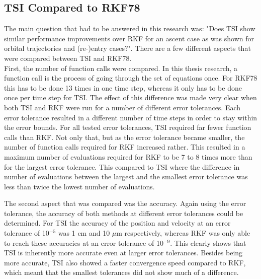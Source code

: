 



\subsection{\ac{TSI} Compared to \ac{RKF78}}
\label{subsec:TSIcomparedToRKF78}
The main question that had to be answered in this research was: "Does \ac{TSI} show similar performance improvements over \ac{RKF} for an ascent case as was shown for orbital trajectories and (re-)entry cases?". There are a few different aspects that were compared between \ac{TSI} and \ac{RKF78}.\\
First, the number of function calls were compared. In this thesis research, a function call is the process of going through the set of equations once. For \ac{RKF78} this has to be done 13 times in one time step, whereas it only has to be done once per time step for \ac{TSI}. The effect of this difference was made very clear when both \ac{TSI} and \ac{RKF} were run for a number of different error tolerances. Each error tolerance resulted in a different number of time steps in order to stay within the error bounds. For all tested error tolerances, \ac{TSI} required far fewer function calls than \ac{RKF}. Not only that, but as the error tolerance became smaller, the number of function calls required for \ac{RKF} increased rather. This resulted in a maximum number of evaluations required for \ac{RKF} to be 7 to 8 times more than for the largest error tolerance. This compared to \ac{TSI} where the difference in number of evaluations between the largest and the smallest error tolerance was less than twice the lowest number of evaluations.

The second aspect that was compared was the accuracy. Again using the error tolerance, the accuracy of both methods at different error tolerances could be determined. For \ac{TSI} the accuracy of the position and velocity at an error tolerance of 10$^{-5}$ was 1 cm and 10 $\mu$m respectively, whereas \ac{RKF} was only able to reach these accuracies at an error tolerance of 10$^{-9}$. This clearly shows that \ac{TSI} is inherently more accurate even at larger error tolerances. Besides being more accurate, \ac{TSI} also showed a faster convergence speed compared to \ac{RKF}, which meant that the smallest tolerances did not show much of a difference.

